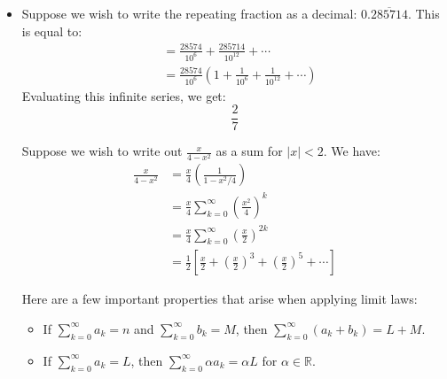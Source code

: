 \begin{itemize}
\begin{equation}
    \end{equation}
    which converges when $|x|<1$.
    \begin{proof}
        Let $S_n = 1 + x + x^2 + \cdots + x^n$ and $xS_n = x + x^2 + x^3 + \cdots + x^{n+1}$. Then subtracting the two, we get:
        \begin{equation}
            S_n-xS_n = 1-x^{n+1} \implies S_n = \frac{1-x^{n+1}}{1-x}
        \end{equation}
        and for $|x|<1$, the limit gives us $\frac{1}{1-x}$ and if $|x|>1$, the limit diverges.
    \end{proof}
    \item Suppose we wish to write the repeating fraction as a decimal: $0.\overline{285714}$. This is equal to:
    \begin{align}
        &= \frac{28574}{10^6} + \frac{285714}{10^12} + \cdots \\ 
        &= \frac{28574}{10^6}\left(1+\frac{1}{10^6}+\frac{1}{10^{12}}+\cdots \right)
    \end{align}
    Evaluating this infinite series, we get:
    \begin{equation}
        \frac{2}{7}
    \end{equation}
    \begin{example}
        Suppose we wish to write out $\frac{x}{4-x^2}$ as a sum for $|x|<2$. We have:
        \begin{align}
            \frac{x}{4-x^2} &= \frac{x}{4}\left(\frac{1}{1-x^2/4}\right) \\ 
            &= \frac{x}{4} \sum_{k=0}^\infty \left(\frac{x^2}{4}\right)^k \\ 
            &= \frac{x}{4} \sum_{k=0}^\infty \left(\frac{x}{2}\right)^{2k} \\ 
            &= \frac{1}{2}\left[\frac{x}{2}+\left(\frac{x}{2}\right)^3+\left(\frac{x}{2}\right)^5+\cdots\right]
        \end{align}
    \end{example}
    \begin{theorem}
        Here are a few important properties that arise when applying limit laws:
        \begin{itemize}
            \item If $\sum_{k=0}^\infty a_k = n$ and $\sum_{k=0}^\infty b_k = M$, then $\sum_{k=0}^\infty (a_k+b_k) = L+M$.
            \item If $\sum_{k=0}^\infty a_k = L$, then $\sum_{k=0}^\infty \alpha a_k = \alpha L$ for $\alpha \in \mathbb{R}$.
        \end{itemize}

\end{theorem}
\end{itemize}
